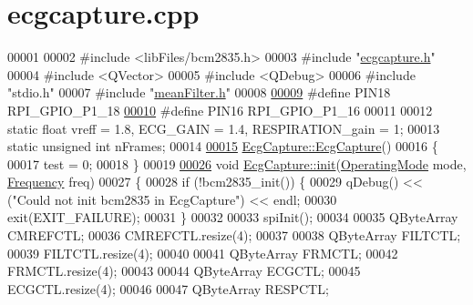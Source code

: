 \hypertarget{ecgcapture_8cpp_source}{}\section{ecgcapture.\+cpp}
\label{ecgcapture_8cpp_source}

\begin{DoxyCode}
00001 
00002 \textcolor{preprocessor}{#include <libFiles/bcm2835.h>}
00003 \textcolor{preprocessor}{#include "\hyperlink{ecgcapture_8h}{ecgcapture.h}"}
00004 \textcolor{preprocessor}{#include <QVector>}
00005 \textcolor{preprocessor}{#include <QDebug>}
00006 \textcolor{preprocessor}{#include "stdio.h"}
00007 \textcolor{preprocessor}{#include "\hyperlink{meanFilter_8h}{meanFilter.h}"}
00008 
\hypertarget{ecgcapture_8cpp_source.tex_l00009}{}\hyperlink{ecgcapture_8cpp_a42dbee90edd2f61e90f501fa3f667761}{00009} \textcolor{preprocessor}{#define PIN18 RPI\_GPIO\_P1\_18}
\hypertarget{ecgcapture_8cpp_source.tex_l00010}{}\hyperlink{ecgcapture_8cpp_aa8a0f35acb2789eeeecec0b656a199b0}{00010} \textcolor{preprocessor}{#define PIN16 RPI\_GPIO\_P1\_16}
00011 
00012 \textcolor{keyword}{static} \textcolor{keywordtype}{float} vreff = 1.8, ECG\_GAIN = 1.4, RESPIRATION\_gain = 1;
00013 \textcolor{keyword}{static} \textcolor{keywordtype}{unsigned} \textcolor{keywordtype}{int} nFrames;
00014 
\hypertarget{ecgcapture_8cpp_source.tex_l00015}{}\hyperlink{group__Device-Facade_gaeef1c0708b94ee82330d6d165a2b5a71}{00015} \hyperlink{group__Device-Facade_gaeef1c0708b94ee82330d6d165a2b5a71}{EcgCapture::EcgCapture}()
00016 \{
00017     test = 0;
00018 \}
00019 
\hypertarget{ecgcapture_8cpp_source.tex_l00026}{}\hyperlink{group__Device-Facade_ga8f080b59e8caab0993bb7ee6b872b6a0}{00026} \textcolor{keywordtype}{void} \hyperlink{group__Device-Facade_ga8f080b59e8caab0993bb7ee6b872b6a0}{EcgCapture::init}(\hyperlink{group__Device-Facade_gabf6e5cc9109a573e29add762dc36df9b}{OperatingMode} mode, \hyperlink{group__Device-Facade_gaaf4f7677ca26944edc0f65195b8729f3}{Frequency} freq)
00027 \{
00028     \textcolor{keywordflow}{if} (!bcm2835\_init()) \{
00029             qDebug() << (\textcolor{stringliteral}{"Could not init bcm2835 in EcgCapture"}) << endl;
00030            exit(EXIT\_FAILURE);
00031     \}
00032 
00033     spiInit();
00034 
00035     QByteArray CMREFCTL;
00036     CMREFCTL.resize(4);
00037 
00038     QByteArray FILTCTL;
00039     FILTCTL.resize(4);
00040 
00041     QByteArray FRMCTL;
00042     FRMCTL.resize(4);
00043 
00044     QByteArray ECGCTL;
00045     ECGCTL.resize(4);
00046 
00047     QByteArray RESPCTL;

\end{DoxyCode}

